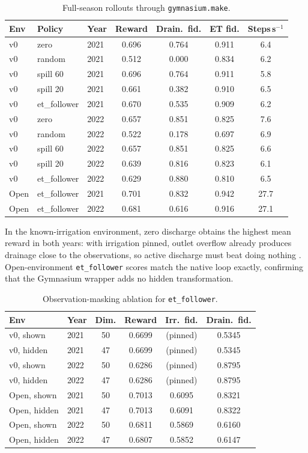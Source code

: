 \documentclass[preprint,12pt,authoryear,review]{elsarticle}
\begin{document}
\begin{table}[htbp]
\centering
\footnotesize
\caption{Full-season rollouts through \texttt{gymnasium.make}.}
\label{tab:gym}
\begin{tabular}{lllcccc}
\toprule
Env & Policy & Year & Reward & Drain.\ fid. & ET fid. & Steps\,s$^{-1}$ \\
\midrule
v0 & zero & 2021 & 0.696 & 0.764 & 0.911 & 6.4 \\
v0 & random & 2021 & 0.512 & 0.000 & 0.834 & 6.2 \\
v0 & spill 60 & 2021 & 0.696 & 0.764 & 0.911 & 5.8 \\
v0 & spill 20 & 2021 & 0.661 & 0.382 & 0.910 & 6.5 \\
v0 & et\_follower & 2021 & 0.670 & 0.535 & 0.909 & 6.2 \\
v0 & zero & 2022 & 0.657 & 0.851 & 0.825 & 7.6 \\
v0 & random & 2022 & 0.522 & 0.178 & 0.697 & 6.9 \\
v0 & spill 60 & 2022 & 0.657 & 0.851 & 0.825 & 6.6 \\
v0 & spill 20 & 2022 & 0.639 & 0.816 & 0.823 & 6.1 \\
v0 & et\_follower & 2022 & 0.629 & 0.880 & 0.810 & 6.5 \\
Open & et\_follower & 2021 & 0.701 & 0.832 & 0.942 & 27.7 \\
Open & et\_follower & 2022 & 0.681 & 0.616 & 0.916 & 27.1 \\
\bottomrule
\end{tabular}
\end{table}

In the known-irrigation environment, zero discharge obtains the highest mean reward in both years: with irrigation pinned, outlet overflow already produces drainage close to the observations, so active discharge must beat doing nothing \citep{kelly2024}. Open-environment \texttt{et\_follower} scores match the native loop exactly, confirming that the Gymnasium wrapper adds no hidden transformation.

\begin{table}[htbp]
\centering
\footnotesize
\caption{Observation-masking ablation for \texttt{et\_follower}.}
\label{tab:mask}
\begin{tabular}{llcccc}
\toprule
Env & Year & Dim. & Reward & Irr.\ fid. & Drain.\ fid. \\
\midrule
v0, shown & 2021 & 50 & 0.6699 & (pinned) & 0.5345 \\
v0, hidden & 2021 & 47 & 0.6699 & (pinned) & 0.5345 \\
v0, shown & 2022 & 50 & 0.6286 & (pinned) & 0.8795 \\
v0, hidden & 2022 & 47 & 0.6286 & (pinned) & 0.8795 \\
Open, shown & 2021 & 50 & 0.7013 & 0.6095 & 0.8321 \\
Open, hidden & 2021 & 47 & 0.7013 & 0.6091 & 0.8322 \\
Open, shown & 2022 & 50 & 0.6811 & 0.5869 & 0.6160 \\
Open, hidden & 2022 & 47 & 0.6807 & 0.5852 & 0.6147 \\
\bottomrule
\end{tabular}
\end{table}
\end{document}
